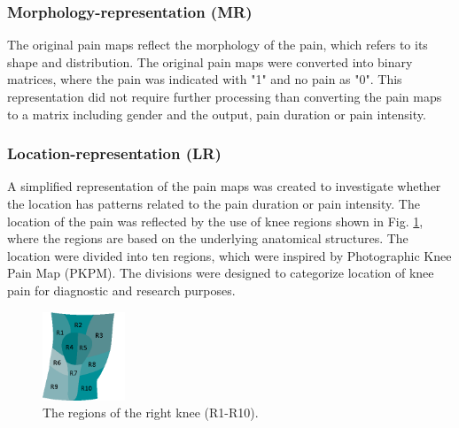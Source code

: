 \subsubsection{Morphology-representation (MR)}
The original pain maps reflect the morphology of the pain, which refers to its shape and distribution. The original pain maps were converted into binary matrices, where the pain was indicated with "1" and no pain as "0". This representation did not require further processing than converting the pain maps to a matrix including gender and the output, pain duration or pain intensity. 

\subsubsection{Location-representation (LR)} 
A simplified representation of the pain maps was created to investigate whether the location has patterns related to the pain duration or pain intensity. The location of the pain was reflected by the use of knee regions shown in Fig. \ref{fig:atlas}, where the regions are based on the underlying anatomical structures.
The location were divided into ten regions, which were inspired by Photographic Knee Pain Map (PKPM). The divisions were designed to categorize location of knee pain for diagnostic and research purposes.\citep{Elson2010}

\begin{figure} [H] 
\centering
\includegraphics[width=0.22\textwidth]{Figures/atlas}
\caption{The regions of the right knee (R1-R10).}
\label{fig:atlas}
\end{figure}

